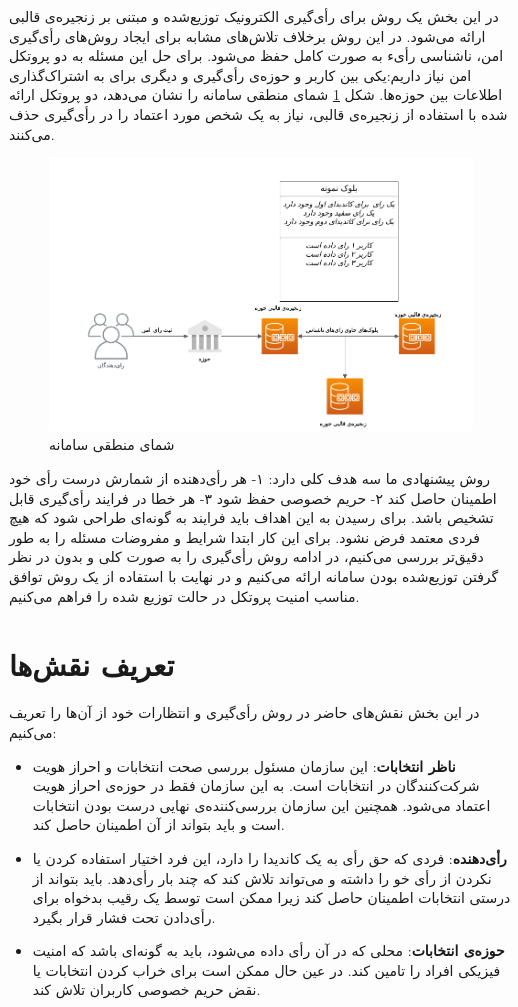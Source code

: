 در این بخش یک روش برای رأی‌گیری الکترونیک توزیع‌شده و مبتنی بر زنجیره‌ی قالبی ارائه می‌شود. در این روش برخلاف تلاش‌های مشابه برای ایجاد روش‌های رأی‌گیری امن، ناشناسی رأیء به صورت کامل حفظ می‌شود. برای حل این مسئله به دو پروتکل امن نیاز داریم:یکی بین کاربر و حوزه‌ی رأی‌گیری و دیگری برای به اشتراک‌گذاری اطلاعات بین حوزه‌ها. شکل \ref{fig:toplevel} شمای منطقی سامانه را نشان می‌دهد، دو پروتکل ارائه شده با استفاده از زنجیره‌ی قالبی، نیاز به یک شخص مورد اعتماد را در رأی‌گیری حذف می‌کنند.
\begin{figure}[h!]
	\centering
	\includegraphics[width=1\linewidth]{toplevel.png}
	\caption {شمای منطقی سامانه}
	\label{fig:toplevel}
\end{figure}


\par
روش پیشنهادی ما سه هدف کلی دارد: ۱- هر رأی‌دهنده از شمارش درست رأی خود اطمینان حاصل کند ۲- حریم خصوصی حفظ شود ۳- هر خطا در فرایند رأی‌گیری قابل تشخیص باشد. برای رسیدن به این اهداف باید فرایند به گونه‌ای طراحی شود که هیچ فردی معتمد فرض نشود. برای این کار ابتدا شرایط و مفروضات مسئله را به طور دقیق‌تر بررسی می‌کنیم، در ادامه روش رأی‌گیری را به صورت کلی و بدون در نظر گرفتن توزیع‌شده بودن سامانه ارائه می‌کنیم و در نهایت با استفاده از یک روش توافق مناسب امنیت پروتکل در حالت توزیع شده را فراهم می‌کنیم. 
\section{تعریف نقش‌ها}
در این بخش نقش‌های حاضر در روش رأی‌گیری و انتظارات خود از آن‌ها را تعریف می‌کنیم:
\begin{itemize}
	\item
	\textbf{ناظر انتخابات}:
	این سازمان مسئول بررسی صحت انتخابات و احراز هویت شرکت‌کنندگان در انتخابات است. به این سازمان فقط در حوزه‌ی احراز هویت اعتماد می‌شود. همچنین این سازمان بررسی‌کننده‌ی نهایی درست بودن انتخابات است و باید بتواند از آن اطمینان حاصل کند.
	\item
	\textbf{رأی‌دهنده}:
	فردی که حق رأی به یک کاندیدا را دارد، این فرد اختیار استفاده کردن یا نکردن از رأی خو را داشته و می‌تواند تلاش کند که چند بار رأی‌دهد. باید بتواند از درستی انتخابات اطمینان حاصل کند زیرا ممکن است توسط یک رقیب بدخواه برای رأی‌دادن تحت فشار قرار بگیرد.
	\item
	\textbf{حوزه‌ی انتخابات}:
	محلی که در آن رأی داده می‌شود، باید به گونه‌ای باشد که امنیت فیزیکی افراد را تامین کند. در عین حال ممکن است برای خراب کردن انتخابات یا نقض حریم خصوصی کاربران تلاش کند. 
\end{itemize}
